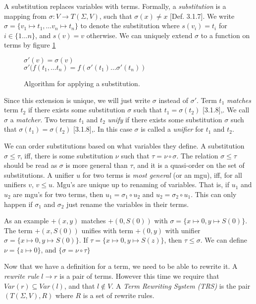 \documentclass{book}
\theoremstyle{definition}
\renewcommand{\leq}{\leqslant}
\begin{document}
A substitution replaces variables with terms.
Formally, a \emph{substitution} is a mapping from 
$\sigma : V \to T(\Sigma,V)$\index{$\sigma$},
such that $\sigma(x) \ne x$ \cite{AdvancedTRS}[Def. 3.1.7].
We write $\sigma = \{v_1 \mapsto t_1, \ldots v_n \mapsto t_n\}$ to denote the substitution
where $s(v_i) = t_i$ for $i \in \{1\ldots n\}$, and $s(v) = v$ otherwise.
We can uniquely extend $\sigma$ to a function on terms by figure \ref{fig:substitute}

\begin{figure}[h]
    $\sigma'(v) = \sigma(v)$\\
    $\sigma'(f(t_1,\ldots t_n) = f(\sigma'(t_1) \ldots \sigma'(t_n))$\\
    \caption{Algorithm for applying a substitution.}
    \label{fig:substitute}
\end{figure}

Since this extension is unique, we will just write $\sigma$ instead of $\sigma'$.
Term $t_1$ \emph{matches} term $t_2$
if there exists some substitution $\sigma$ such that $t_1 = \sigma(t_2)$ \cite{AdvancedTRS}[3.1.8],.
We call $\sigma$ a \emph{matcher}.
Two terms $t_1$ and $t_2$ \emph{unify}
if there exists some substitution $\sigma$ such that $\sigma(t_1) = \sigma(t_2)$ \cite{AdvancedTRS}[3.1.8],.
In this case $\sigma$ is called a \emph{unifier} for $t_1$ and $t_2$.

We can order substitutions based on what variables they define.
A substitution $\sigma \leq \tau$, iff,
there is some substitution $\nu$ such that $\tau = \nu \circ \sigma$.
The relation $\sigma \leq \tau$ should be read as $\sigma$ is more general than $\tau$,
and it is a quasi-order on the set of substitutions.
A unifier $u$ for two terms is \emph{most general} (or an mgu), iff, for all unifiers $v$, $v \le u$.
Mgu's are unique up to renaming of variables.
That is, if $u_1$ and $u_2$ are mgu's for two terms, then $u_1 = \sigma_1 \circ u_2$
and $u_2 = \sigma_2 \circ u_1$.
This can only happen if $\sigma_1$ and $\sigma_2$ just rename the variables in their terms.

As an example $+(x,y)$ matches $+(0, S(0))$ with $\sigma = \{x \mapsto 0, y \mapsto S(0)\}$.
The term $+(x, S(0))$ unifies with term $+(0, y)$ with unifier
$\sigma = \{x \mapsto 0, y \mapsto S(0)\}$.
If $\tau = \{x \mapsto 0, y \mapsto S(z)\}$, then $\tau \le \sigma$.  We can define $\nu = \{z \mapsto 0\}$,
and $\{\sigma = \nu \circ \tau\}$

Now that we have a definition for a term, we need to be able to rewrite it.
A \emph{rewrite rule} $l \to r$ is a pair of terms.
However this time we require that $Var(r) \subseteq Var(l)$, and that $l \not \in V$.
A \emph{Term Rewriting System (TRS)}
is the pair $(T(\Sigma,V),R)$ where $R$ is a set of rewrite rules.
\end{document}
